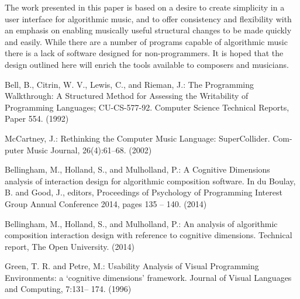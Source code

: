 \documentclass[runningheads,a4paper]{llncs}
\begin{document}
The work presented in this paper is based on a desire to create simplicity in a user interface for algorithmic music, and to offer consistency and flexibility with an emphasis on enabling musically useful structural changes to be made quickly and easily. While there are a number of programs capable of algorithmic music there is a lack of software designed for non-programmers. It is hoped that the design outlined here will enrich the tools available to composers and musicians.


\begin{thebibliography}{4}

 Bell, B., Citrin, W. V., Lewis, C., and Rieman, J.: The Programming Walkthrough: A Structured Method for Assessing the Writability of Programming Languages; CU-CS-577-92. Computer Science Technical Reports, Paper 554. (1992)

 McCartney, J.: Rethinking the Computer Music Language: SuperCollider. Com- puter Music Journal, 26(4):61–68. (2002)

 Bellingham, M., Holland, S., and Mulholland, P.: A Cognitive Dimensions analysis of interaction design for algorithmic composition software. In du Boulay, B. and Good, J., editors, Proceedings of Psychology of Programming Interest Group Annual Conference 2014, pages 135 -- 140. (2014)

 Bellingham, M., Holland, S., and Mulholland, P.: An analysis of algorithmic composition interaction design with reference to cognitive dimensions. Technical report, The Open University. (2014)

 Green, T. R. and Petre, M.:  Usability Analysis of Visual Programming Environments: a `cognitive dimensions' framework. Journal of Visual Languages and Computing, 7:131– 174. (1996)


\end{thebibliography}
\end{document}

